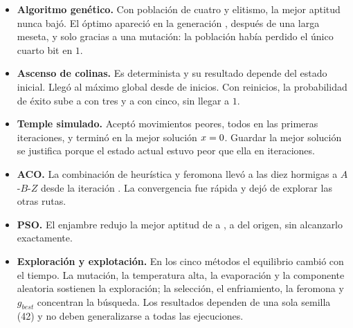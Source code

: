 \documentclass[12pt,a4paper]{article}
\begin{document}
\begin{itemize}
  \item \textbf{Algoritmo genético.} Con población de cuatro y elitismo, la
  mejor aptitud nunca bajó. El óptimo \PunoOptimo{} apareció en la generación
  \PunoPrimeraGen{}, después de una larga meseta, y solo gracias a una
  mutación: la población había perdido el único cuarto bit en $1$.
  \item \textbf{Ascenso de colinas.} Es determinista y su resultado depende
  del estado inicial. Llegó al máximo global desde \PdosExitos{} de
  \PdosTotal{} inicios. Con reinicios, la probabilidad de éxito sube a
  \PdosProbTres{} con tres y a \PdosProbCinco{} con cinco, sin llegar a $1$.
  \item \textbf{Temple simulado.} Aceptó \PtresPeores{} movimientos peores,
  todos en las primeras \PtresUltimoPeor{} iteraciones, y terminó en la mejor solución
  $x=0$. Guardar la mejor solución se justifica porque el estado
  actual estuvo peor que ella en \PtresPeorQueMejor{} iteraciones.
  \item \textbf{ACO.} La combinación de heurística y feromona llevó a las
  diez hormigas a $A$-$B$-$Z$ desde la iteración \PcuatroIterTodas{}. La
  convergencia fue rápida y dejó de explorar las otras rutas.
  \item \textbf{PSO.} El enjambre redujo la mejor aptitud de
  \PcincoFInicial{} a \PcincoF{}, a \PcincoDist{} del origen, sin alcanzarlo
  exactamente.
  \item \textbf{Exploración y explotación.} En los cinco métodos el equilibrio
  cambió con el tiempo. La mutación, la temperatura alta, la evaporación y la
  componente aleatoria sostienen la exploración; la selección, el enfriamiento,
  la feromona y $g_{best}$ concentran la búsqueda. Los resultados dependen de
  una sola semilla (42) y no deben generalizarse a todas las ejecuciones.
\end{itemize}
\end{document}
